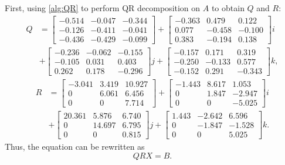 \documentclass[12pt]{article}
\numberwithin{equation}{section}
\begin{document}
First, using \cref{alg:QR} to perform QR decomposition on $A$ to obtain $Q$ and $R:$
\setlength{\jot}{2pt}
\setlength{\arraycolsep}{1pt}
\begin{align*}
  Q &=
     \begin{bmatrix}
    -0.514 & -0.047 & -0.344 \\
    -0.126 & -0.411 & -0.041 \\
    -0.436 & -0.429 & -0.099
    \end{bmatrix} +
    \begin{bmatrix}
    -0.363 &  0.479 &  0.122 \\
     0.077 & -0.458 & -0.100 \\
     0.383 & -0.194 &  0.138
    \end{bmatrix} i\\
    &+ 
    \begin{bmatrix}
    -0.236 & -0.062 & -0.155 \\
    -0.105 &  0.031 &  0.403 \\
     0.262 &  0.178 & -0.296
    \end{bmatrix} j +
    \begin{bmatrix}
    -0.157 &  0.171 &  0.319 \\
    -0.250 & -0.133 &  0.577 \\
    -0.152 &  0.291 & -0.343
    \end{bmatrix} k,
    \end{align*}
    \begin{align*}
  R &=
    \begin{bmatrix}
    -3.041 & 3.419 & 10.927 \\
     0     & 6.061 & 6.456 \\
     0     & 0     & 7.714
    \end{bmatrix} +
    \begin{bmatrix}
    -1.443 & 8.617 &  1.053 \\
     0     & 1.847 & -2.947 \\
     0     & 0     & -5.025
    \end{bmatrix} i\\
    &+ 
    \begin{bmatrix}
    20.361 & 5.876  & 6.740 \\
     0     & 14.697 & 6.795 \\
     0     & 0      & 0.815
    \end{bmatrix} j +
    \begin{bmatrix}
    1.443 & -2.642 &  6.596 \\
    0     & -1.847 & -1.528 \\
    0     &  0     &  5.025
    \end{bmatrix} k.
\end{align*}
Thus, the equation can be rewritten as
\begin{equation}
    QRX = B.\label{eq:example1}
\end{equation}
\end{document}
